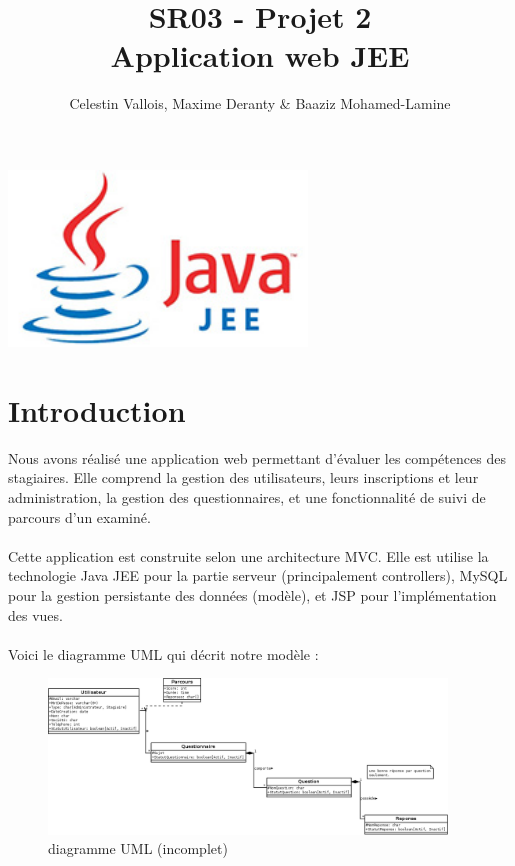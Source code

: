 \documentclass[12pt]{article}
\author{Celestin Vallois, Maxime Deranty \& Baaziz Mohamed-Lamine}
\title{SR03 - Projet 2 \\  Application web JEE}
\begin{document}
\maketitle

\vspace{2cm}

\begin{center}
	\includegraphics[width=300px]{java-jee-logo.jpg}
\end{center}

\newpage
\tableofcontents
\newpage

\part*{Introduction}
Nous avons réalisé une application web permettant d'évaluer les compétences des stagiaires. Elle comprend la gestion des utilisateurs, leurs inscriptions et leur administration, la gestion des questionnaires, et une fonctionnalité de suivi de parcours d'un examiné.\\ \\

Cette application est construite selon une architecture MVC. Elle est utilise la technologie Java JEE pour la partie serveur (principalement controllers), MySQL pour la gestion persistante des données (modèle), et JSP pour l'implémentation des vues. \\ \\

Voici le diagramme UML qui décrit notre modèle : \\ 

\begin{center}
	\begin{figure}[hbt]
		\includegraphics[width=400px]{../model/Modele.png}
		\caption{diagramme UML (incomplet)}
	\end{figure}
\end{center}
\end{document}
